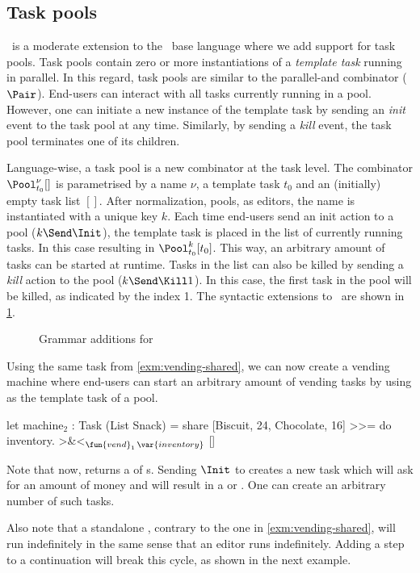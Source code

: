 \subsection{Task pools}

\DYNTOPHAT\ is a moderate extension to the \TOPHAT\ base language where we add support for task pools.
Task pools contain zero or more instantiations of a \emph{template task} running in parallel.
In this regard, task pools are similar to the parallel-and combinator ($\Pair$).
End-users can interact with all tasks currently running in a pool.
However, one can initiate a new instance of the template task by sending an \emph{init} event to the task pool at any time.
Similarly, by sending a \emph{kill} event, the task pool terminates one of its children.

Language-wise, a task pool is a new combinator at the task level.
The combinator $\Pool^\nu_{t_0} []$ is parametrised by a name $\nu$, a template task $t_0$ and an (initially) empty task list $[]$.
After normalization, pools, as editors, the name is instantiated with a unique key $k$.
Each time end-users send an init action to a pool ($k\Send\Init$), the template task is placed in the list of currently running tasks.
In this case resulting in $\Pool^k_{t_0} [t_0]$.
This way, an arbitrary amount of tasks can be started at runtime.
Tasks in the list can also be killed by sending a \emph{kill} action to the pool ($k\Send\Kill1$).
In this case, the first task in the pool will be killed, as indicated by the index 1.
The syntactic extensions to \TOPHAT\ are shown in \cref{fig:dynamic-grammar}.

\begin{figure}
  \caption{Grammar additions for \DYNTOPHAT}
  \label{fig:dynamic-grammar}
\end{figure}

\begin{example}
  \label{exm:vending-dynamic}
  Using the same  task from \cref{exm:vending-shared},
  we can now create a vending machine where end-users can start an arbitrary amount of vending tasks
  by using  as the template task of a pool.
  \begin{TASK}[emph={inventory}]
    let machine$_2$ : Task (List Snack) =
      share [{Biscuit, 24}, {Chocolate, 16}] >>= do inventory.
      >&<$_{\fun{vend}_1\,\var{inventory}}$ []
  \end{TASK}
  Note that now,  returns a  of s.
  Sending $\Init$ to  creates a new  task
  which will ask for an amount of money and will result in a  or .
  One can create an arbitrary number of such tasks.

  Also note that a standalone , contrary to the one in \cref{exm:vending-shared}, will run indefinitely
  in the same sense that an editor runs indefinitely.
  Adding a step to a continuation will break this cycle,
  as shown in the next example.
\end{example}

